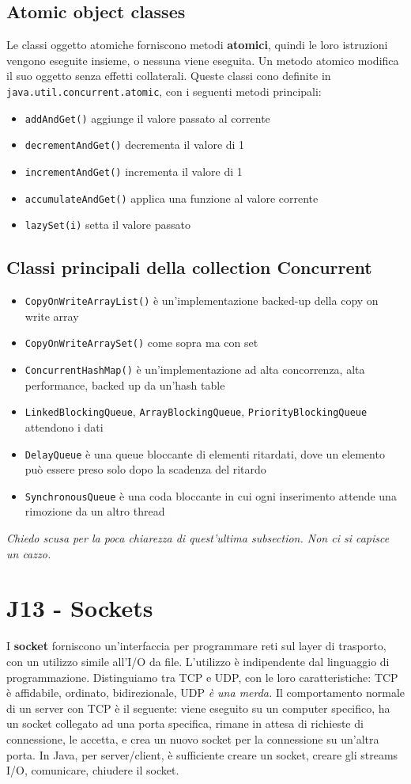 \documentclass[11pt]{article}
\newcommand{\code}[1]{\texttt{#1}}
\begin{document}
\subsection{Atomic object classes}
Le classi oggetto atomiche forniscono metodi \textbf{atomici}, quindi le loro istruzioni vengono eseguite insieme, o nessuna viene eseguita. Un metodo atomico modifica il suo oggetto senza effetti collaterali. Queste classi cono definite in \code{java.util.concurrent.atomic}, con i seguenti metodi principali:
\begin{itemize}
    \item \code{addAndGet()} aggiunge il valore passato al corrente
    \item \code{decrementAndGet()} decrementa il valore di 1
    \item \code{incrementAndGet()} incrementa il valore di 1
    \item \code{accumulateAndGet()} applica una funzione al valore corrente
    \item \code{lazySet(i)} setta il valore passato
\end{itemize}
\subsection{Classi principali della collection Concurrent}
\begin{itemize}
    \item \code{CopyOnWriteArrayList()} è un'implementazione backed-up della copy on write array
    \item \code{CopyOnWriteArraySet()} come sopra ma con set
    \item \code{ConcurrentHashMap()} è un'implementazione ad alta concorrenza, alta performance, backed up da un'hash table
    \item \code{LinkedBlockingQueue}, \code{ArrayBlockingQueue}, \code{PriorityBlockingQueue} attendono i dati 
    \item \code{DelayQueue} è una queue bloccante di elementi ritardati, dove un elemento può essere preso solo dopo la scadenza del ritardo
    \item \code{SynchronousQueue} è una coda bloccante in cui ogni inserimento attende una rimozione da un altro thread
\end{itemize}
\textit{Chiedo scusa per la poca chiarezza di quest'ultima subsection. Non ci si capisce un cazzo.}

\section{J13 - Sockets}
I \textbf{socket} forniscono un'interfaccia per programmare reti sul layer di trasporto, con un utilizzo simile all'I/O da file. L'utilizzo è indipendente dal linguaggio di programmazione. 
Distinguiamo tra TCP e UDP, con le loro caratteristiche: TCP è affidabile, ordinato, bidirezionale, UDP \textit{è una merda.} Il comportamento normale di un server con TCP è il seguente: viene eseguito su un computer specifico, ha un socket collegato ad una porta specifica, rimane in attesa di richieste di connessione, le accetta, e crea un nuovo socket per la connessione su un'altra porta. In Java, per server/client, è sufficiente creare un socket, creare gli streams I/O, comunicare, chiudere il socket. 
\end{document}
